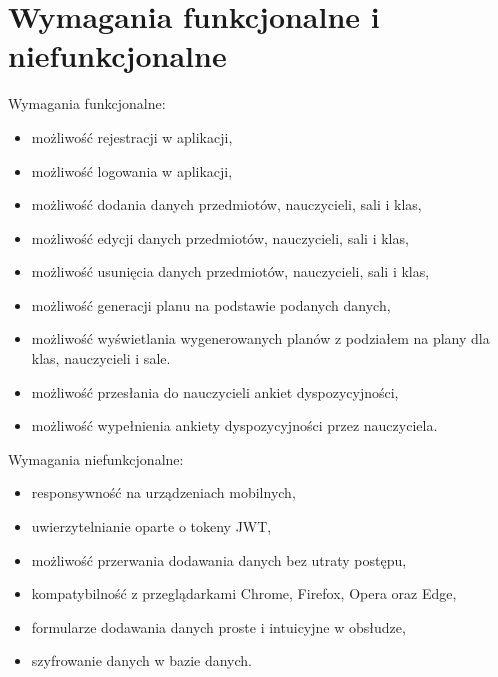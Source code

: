 \section{Wymagania funkcjonalne i niefunkcjonalne}
Wymagania funkcjonalne:
\begin{itemize}
    \item możliwość rejestracji w aplikacji,
    \item możliwość logowania w aplikacji,
    \item możliwość dodania danych przedmiotów, nauczycieli, sali i klas,
    \item możliwość edycji danych przedmiotów, nauczycieli, sali i klas,
    \item możliwość usunięcia danych przedmiotów, nauczycieli, sali i klas,
    \item możliwość generacji planu na podstawie podanych danych,
     \item możliwość wyświetlania wygenerowanych planów z podziałem na plany dla klas, nauczycieli i sale.
    \item możliwość przesłania do nauczycieli ankiet dyspozycyjności,
    \item możliwość wypełnienia ankiety dyspozycyjności przez nauczyciela.
\end{itemize}
Wymagania niefunkcjonalne:
\begin{itemize}
    \item responsywność na urządzeniach mobilnych,
    \item uwierzytelnianie oparte o tokeny JWT,
    \item możliwość przerwania dodawania danych bez utraty postępu,
    \item kompatybilność z przeglądarkami Chrome, Firefox, Opera oraz Edge,
    \item formularze dodawania danych proste i intuicyjne w obsłudze,
    \item szyfrowanie danych w bazie danych.
\end{itemize}

